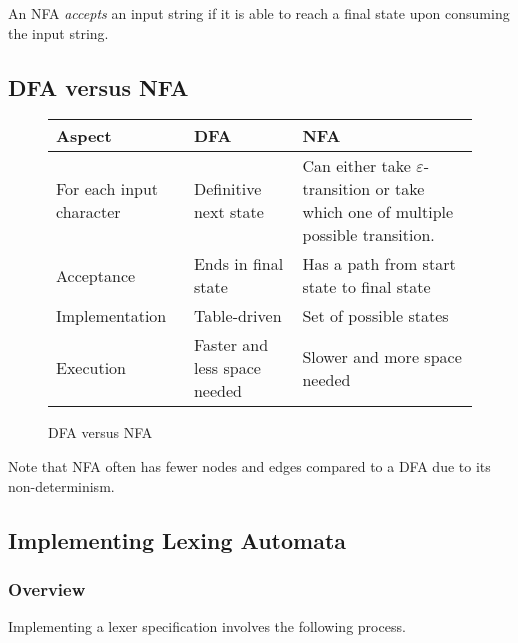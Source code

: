 \begin{definition}
    An NFA \textit{accepts} an input string if it is able to reach a final state upon consuming the input string.
\end{definition}

\subsection{DFA versus NFA}

\begin{figure}[H]
    \centering
    \begin{tabular}{@{} p{10em} p{10em} p{10em} @{}}
        \toprule
        Aspect & DFA & NFA \\
        \midrule
        For each input character 
        & Definitive next state 
        & Can either take $\varepsilon$-transition or take which one of multiple possible transition. \\
        Acceptance
        & Ends in final state
        & Has a path from start state to final state \\
        Implementation 
        & Table-driven
        & Set of possible states \\
        Execution
        & Faster and less space needed
        & Slower and more space needed \\
        \bottomrule
    \end{tabular}
    \caption{DFA versus NFA}
    \label{fig:dfa-vs-nfa}
\end{figure}

\begin{remark}
    Note that NFA often has fewer nodes and edges compared to a DFA due to its non-determinism.
\end{remark}

\subsection{Implementing Lexing Automata}

\subsubsection{Overview}

Implementing a lexer specification involves the following process.

